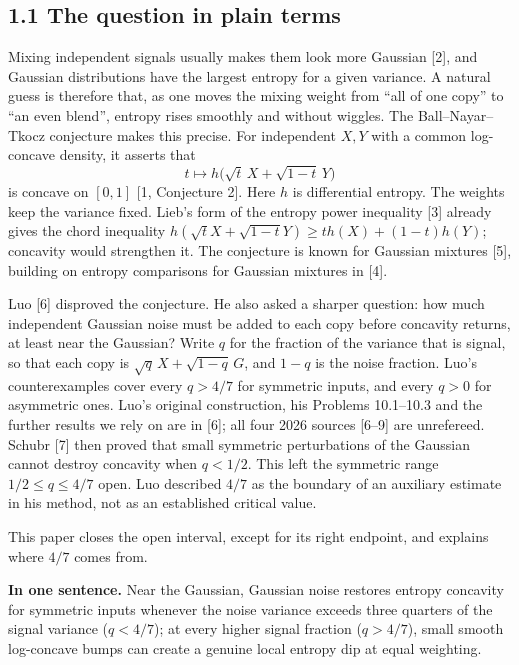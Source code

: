 \documentclass[
  british,
  10pt,
]{article}
\begin{document}
\subsection{1.1 The question in plain
terms}\label{the-question-in-plain-terms}

Mixing independent signals usually makes them look more Gaussian
{[}2{]}, and Gaussian distributions have the largest entropy for a given
variance. A natural guess is therefore that, as one moves the mixing
weight from ``all of one copy'' to ``an even blend'', entropy rises
smoothly and without wiggles. The Ball--Nayar--Tkocz conjecture makes
this precise. For independent \(X,Y\) with a common log-concave density,
it asserts that \[
t\longmapsto h\bigl(\sqrt t\,X+\sqrt{1-t}\,Y\bigr)
\] is concave on \([0,1]\) {[}1, Conjecture 2{]}. Here \(h\) is
differential entropy. The weights keep the variance fixed. Lieb's form
of the entropy power inequality {[}3{]} already gives the chord
inequality \(h(\sqrt tX+\sqrt{1-t}Y)\ge th(X)+(1-t)h(Y)\); concavity
would strengthen it. The conjecture is known for Gaussian mixtures
{[}5{]}, building on entropy comparisons for Gaussian mixtures in
{[}4{]}.

Luo {[}6{]} disproved the conjecture. He also asked a sharper question:
how much independent Gaussian noise must be added to each copy before
concavity returns, at least near the Gaussian? Write \(q\) for the
fraction of the variance that is signal, so that each copy is
\(\sqrt q\,X+\sqrt{1-q}\,G\), and \(1-q\) is the noise fraction. Luo's
counterexamples cover every \(q>4/7\) for symmetric inputs, and every
\(q>0\) for asymmetric ones. Luo's original construction, his Problems
10.1--10.3 and the further results we rely on are in {[}6{]}; all four
2026 sources {[}6--9{]} are unrefereed. Schubr {[}7{]} then proved that
small symmetric perturbations of the Gaussian cannot destroy concavity
when \(q<1/2\). This left the symmetric range \(1/2\le q\le4/7\) open.
Luo described \(4/7\) as the boundary of an auxiliary estimate in his
method, not as an established critical value.

This paper closes the open interval, except for its right endpoint, and
explains where \(4/7\) comes from.

\textbf{In one sentence.} Near the Gaussian, Gaussian noise restores
entropy concavity for symmetric inputs whenever the noise variance
exceeds three quarters of the signal variance (\(q<4/7\)); at every
higher signal fraction (\(q>4/7\)), small smooth log-concave bumps can
create a genuine local entropy dip at equal weighting.
\end{document}
